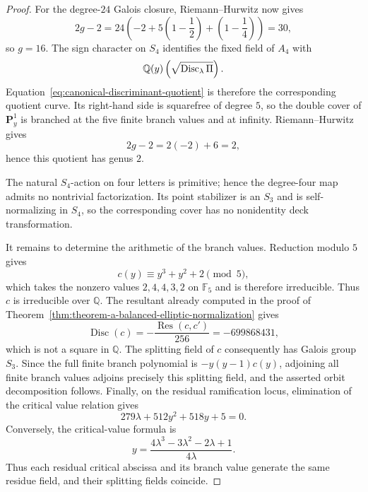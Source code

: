 \begin{proof}
For the degree-$24$ Galois closure, Riemann--Hurwitz now gives
\[
2g-2
=24\left(-2+5\left(1-\frac12\right)
+\left(1-\frac14\right)\right)
=30,
\]
so $g=16$.  The sign character on $S_4$ identifies the fixed field of $A_4$
with
\[
\mathbb Q(y)\left(\sqrt{\operatorname{Disc}_\lambda\Pi}\right).
\]
Equation~\eqref{eq:canonical-discriminant-quotient} is therefore the
corresponding quotient curve.  Its right-hand side is squarefree of degree
$5$, so the double cover of $\mathbf P^1_y$ is branched at the five finite
branch values and at infinity.  Riemann--Hurwitz gives
\[
2g-2=2(-2)+6=2,
\]
hence this quotient has genus $2$.

The natural $S_4$-action on four letters is primitive; hence the
degree-four map admits no nontrivial factorization.  Its point stabilizer is
an $S_3$ and is self-normalizing in $S_4$, so the corresponding cover has no
nonidentity deck transformation.

It remains to determine the arithmetic of the branch values.  Reduction
modulo $5$ gives
\[
c(y)\equiv y^3+y^2+2\pmod 5,
\]
which takes the nonzero values $2,4,4,3,2$ on $\mathbb F_5$ and is therefore
irreducible.  Thus $c$ is irreducible over $\mathbb Q$.  The resultant already
computed in the proof of Theorem~\ref{thm:theorem-a-balanced-elliptic-normalization}
gives
\[
\operatorname{Disc}(c)
=-\frac{\operatorname{Res}(c,c')}{256}
=-699868431,
\]
which is not a square in $\mathbb Q$.  The splitting field of $c$ consequently
has Galois group $S_3$.  Since the full finite branch polynomial is
$-y(y-1)c(y)$, adjoining all finite branch values adjoins precisely this
splitting field, and the asserted orbit decomposition follows.
Finally, on the residual ramification locus, elimination of the critical
value relation gives
\begin{equation}\label{eq:residual-ramification-field-relation}
279\lambda+512y^2+518y+5=0.
\end{equation}
Conversely, the critical-value formula is
\[
y=\frac{4\lambda^3-3\lambda^2-2\lambda+1}{4\lambda}.
\]
Thus each residual critical abscissa and its branch value generate the same
residue field, and their splitting fields coincide.
\end{proof}

